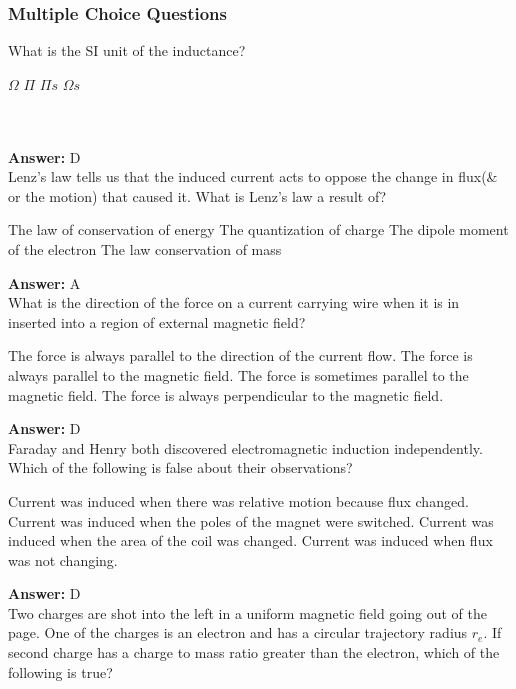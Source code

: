 \documentclass[12pt,addpoints]{exam}
\begin{document}
{{{				\subsubsection*{Multiple Choice Questions}
				\begin{questions}
					\question What is the SI unit of the inductance? \\ \begin{oneparchoices}
						\choice $\Omega$
						\choice $\Pi$
						\choice $\Pi s$
						\choice $\Omega s$
					\end{oneparchoices}
					\\  \\ \textbf{Answer:} D\\
					\question Lenz's law tells us that the induced current acts to oppose the change in flux(\& or the motion) that caused it. What is Lenz's law a result of?
					\begin{choices}
						\choice The law of conservation of energy
						\choice The quantization of charge
						\choice The dipole moment of the electron
						\choice The law conservation of mass
					\end{choices}
					\textbf{Answer:} A\\ 
					\question What is the direction of the force on a current carrying wire when it is in inserted into a region of external magnetic field?
					\begin{choices}
						\choice The force is always parallel to the direction of the current flow.
						\choice The force is always parallel to the magnetic field.
						\choice The force is sometimes parallel to the magnetic field.
						\choice The force is always perpendicular to the magnetic field.
					\end{choices}
					\textbf{Answer:} D\\ 
					\question Faraday and Henry both discovered electromagnetic induction independently. Which of the following is false about their observations?
					\begin{choices}
						\choice Current was induced when there was relative motion because flux changed.
						\choice Current was induced when the poles of the magnet were switched.
						\choice Current was induced when the area of the coil was changed.
						\choice Current was induced when flux was not changing.
					\end{choices}
					\textbf{Answer:} D\\ 
					\question Two charges are shot into the left in a uniform magnetic field going out of the page. One of the charges is an electron and has a circular trajectory radius $r_e$. If second charge has a charge to mass ratio greater than the electron, which of the following is true?

\end{questions}}}}
\end{document}
